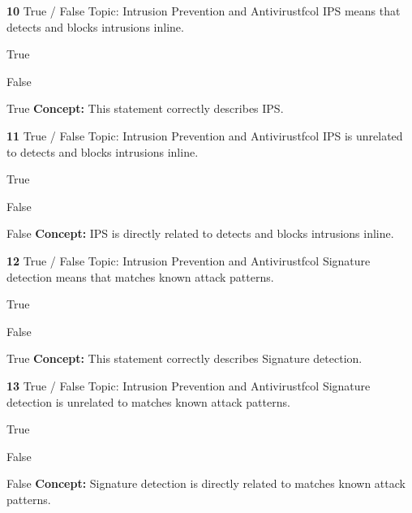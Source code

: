 \documentclass[10pt,a4paper]{article}
\begin{document}
\begin{qcard}{\color{white}\textbf{10} \hfill \small True / False \textbar{} Topic: Intrusion Prevention and Antivirus}{tfcol}
IPS means that detects and blocks intrusions inline.

\begin{qoptions}
\item True
\item False
\end{qoptions}
\begin{explainbox}{True}
\textbf{Concept:} This statement correctly describes IPS.
\end{explainbox}
\end{qcard}

\begin{qcard}{\color{white}\textbf{11} \hfill \small True / False \textbar{} Topic: Intrusion Prevention and Antivirus}{tfcol}
IPS is unrelated to detects and blocks intrusions inline.

\begin{qoptions}
\item True
\item False
\end{qoptions}
\begin{explainbox}{False}
\textbf{Concept:} IPS is directly related to detects and blocks intrusions inline.
\end{explainbox}
\end{qcard}

\begin{qcard}{\color{white}\textbf{12} \hfill \small True / False \textbar{} Topic: Intrusion Prevention and Antivirus}{tfcol}
Signature detection means that matches known attack patterns.

\begin{qoptions}
\item True
\item False
\end{qoptions}
\begin{explainbox}{True}
\textbf{Concept:} This statement correctly describes Signature detection.
\end{explainbox}
\end{qcard}

\begin{qcard}{\color{white}\textbf{13} \hfill \small True / False \textbar{} Topic: Intrusion Prevention and Antivirus}{tfcol}
Signature detection is unrelated to matches known attack patterns.

\begin{qoptions}
\item True
\item False
\end{qoptions}
\begin{explainbox}{False}
\textbf{Concept:} Signature detection is directly related to matches known attack patterns.
\end{explainbox}
\end{qcard}
\end{document}
